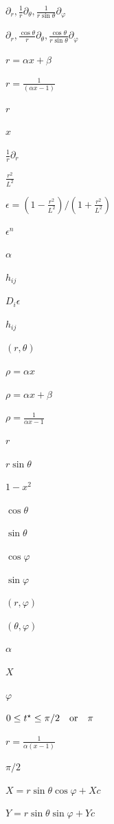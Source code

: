\documentclass{article}
\begin{document}
$ \partial_r, \frac{1}{r}\partial_\theta, \frac{1}{r\sin\theta}\partial_\varphi$
\pagebreak

$ \partial_r, \frac{\cos \theta}{r}\partial_\theta, \frac{\cos \theta}{r\sin\theta}\partial_\varphi$
\pagebreak

$ r = \alpha x + \beta $
\pagebreak

$ r = \frac{1}{\left(\alpha x -1\right)} $
\pagebreak

$r$
\pagebreak

$x$
\pagebreak

$\frac{1}{r} \partial_r$
\pagebreak

$ \frac{r^2}{L^2} $
\pagebreak

$\epsilon = (1 - \frac{r^2}{L^2})/(1 + \frac{r^2}{L^2})$
\pagebreak

$\epsilon^n$
\pagebreak

$ \alpha $
\pagebreak

$h_{ij}$
\pagebreak

$ D_i \epsilon$
\pagebreak

$ h_{ij} $
\pagebreak

$(r,\theta)$
\pagebreak

$ \rho = \alpha x $
\pagebreak

$ \rho = \alpha x + \beta $
\pagebreak

$ \rho = \displaystyle\frac{1}{\alpha x -1}$
\pagebreak

$ r$
\pagebreak

$ r\sin \theta$
\pagebreak

$ 1-x^2$
\pagebreak

$\cos \theta$
\pagebreak

$\sin \theta$
\pagebreak

$\cos \varphi$
\pagebreak

$\sin \varphi$
\pagebreak

$(r,\varphi)$
\pagebreak

$(\theta, \varphi)$
\pagebreak

$\alpha$
\pagebreak

$X$
\pagebreak

$ \varphi$
\pagebreak

$ 0 \leq t^\star \leq \pi/2 \quad {\rm or} \quad \pi$
\pagebreak

$ r = \frac{1}{\alpha \left(x-1\right)} $
\pagebreak

$ \pi/2$
\pagebreak

$ X = r \sin\theta \cos\varphi + Xc $
\pagebreak

$ Y = r \sin\theta \sin\varphi + Yc $
\pagebreak
\end{document}
